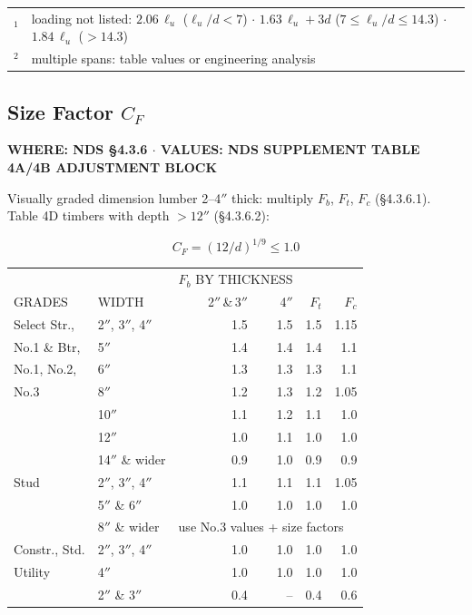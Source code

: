 \documentclass[10pt]{article}
\begin{document}
\smallskip
{\ttfamily\footnotesize
\begin{tabular}{@{}ll@{}}
$^{1}$ & loading not listed: $2.06\,\ell_u$ ($\ell_u/d<7$) $\cdot$ $1.63\,\ell_u+3d$ ($7\le\ell_u/d\le14.3$) $\cdot$ $1.84\,\ell_u$ ($>14.3$) \\
$^{2}$ & multiple spans: table values or engineering analysis \\
\end{tabular}}

\subsection{Size Factor $C_F$}

{\ttfamily\footnotesize\bfseries WHERE: NDS \S 4.3.6 $\cdot$ VALUES: NDS SUPPLEMENT TABLE 4A/4B ADJUSTMENT BLOCK}

\medskip
Visually graded dimension lumber 2--4$''$ thick: multiply $F_b$, $F_t$, $F_c$ (\S 4.3.6.1). Table 4D timbers with depth $> 12''$ (\S 4.3.6.2):

\begin{equation}
C_F = \left(12/d\right)^{1/9} \le 1.0
\end{equation}

\medskip
{\setlength{\arrayrulewidth}{0.5pt}\ttfamily\footnotesize
\begin{tabular}{@{}llrrrr@{}}
\hline
 & & \multicolumn{2}{c}{{\scriptsize $F_b$ BY THICKNESS}} & & \\
{\scriptsize GRADES} & {\scriptsize WIDTH} & {\scriptsize 2$''$\,\&\,3$''$} & {\scriptsize 4$''$} & {\scriptsize $F_t$} & {\scriptsize $F_c$} \\
\hline
Select Str., & 2$''$, 3$''$, 4$''$ & 1.5 & 1.5 & 1.5 & 1.15 \\
No.1 \& Btr, & 5$''$              & 1.4 & 1.4 & 1.4 & 1.1 \\
No.1, No.2,  & 6$''$              & 1.3 & 1.3 & 1.3 & 1.1 \\
No.3         & 8$''$              & 1.2 & 1.3 & 1.2 & 1.05 \\
             & 10$''$             & 1.1 & 1.2 & 1.1 & 1.0 \\
             & 12$''$             & 1.0 & 1.1 & 1.0 & 1.0 \\
             & 14$''$ \& wider    & 0.9 & 1.0 & 0.9 & 0.9 \\
\hline
Stud         & 2$''$, 3$''$, 4$''$ & 1.1 & 1.1 & 1.1 & 1.05 \\
             & 5$''$ \& 6$''$      & 1.0 & 1.0 & 1.0 & 1.0 \\
             & 8$''$ \& wider      & \multicolumn{4}{l}{use No.3 values + size factors} \\
\hline
Constr., Std.& 2$''$, 3$''$, 4$''$ & 1.0 & 1.0 & 1.0 & 1.0 \\
\hline
Utility      & 4$''$               & 1.0 & 1.0 & 1.0 & 1.0 \\
             & 2$''$ \& 3$''$      & 0.4 & --  & 0.4 & 0.6 \\
\hline
\end{tabular}}
\end{document}
